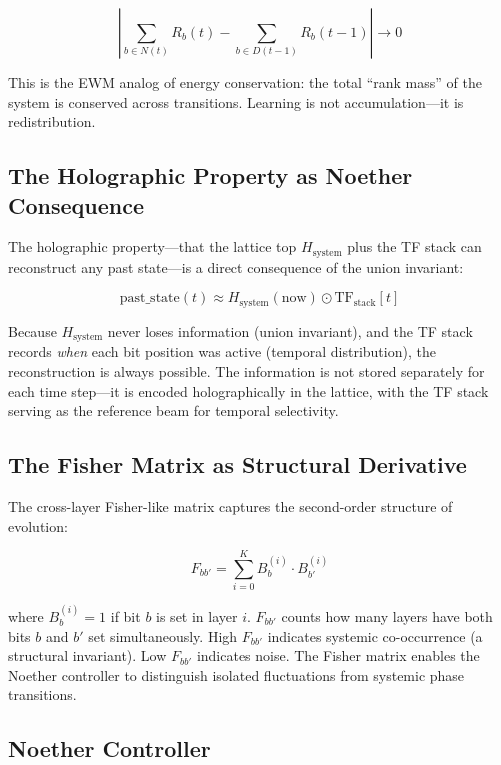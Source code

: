 \documentclass[11pt,a4paper]{article}
\theoremstyle{remark}
\begin{document}
\begin{equation}
  \left|\sum_{b \in N(t)} R_b(t) - \sum_{b \in D(t-1)} R_b(t-1)\right| \to 0
\end{equation}

This is the EWM analog of energy conservation: the total ``rank mass'' of the system is
conserved across transitions. Learning is not accumulation---it is redistribution.

\subsection{The Holographic Property as Noether Consequence}

The holographic property---that the lattice top $H_{\text{system}}$ plus the TF stack
can reconstruct any past state---is a direct consequence of the union invariant:

\begin{equation}
  \text{past\_state}(t) \approx H_{\text{system}}(\text{now}) \odot
  \text{TF}_{\text{stack}}[t]
\end{equation}

Because $H_{\text{system}}$ never loses information (union invariant), and the TF stack
records \textit{when} each bit position was active (temporal distribution), the
reconstruction is always possible. The information is not stored separately for each
time step---it is encoded holographically in the lattice, with the TF stack serving as
the reference beam for temporal selectivity.

\subsection{The Fisher Matrix as Structural Derivative}

The cross-layer Fisher-like matrix captures the second-order structure of evolution:

\begin{equation}
  F_{bb'} = \sum_{i=0}^{K} B^{(i)}_b \cdot B^{(i)}_{b'}
\end{equation}

where $B^{(i)}_b = 1$ if bit $b$ is set in layer $i$. $F_{bb'}$ counts how many layers
have both bits $b$ and $b'$ set simultaneously. High $F_{bb'}$ indicates systemic
co-occurrence (a structural invariant). Low $F_{bb'}$ indicates noise. The Fisher matrix
enables the Noether controller to distinguish isolated fluctuations from systemic phase
transitions.

\subsection{Noether Controller}
\end{document}
